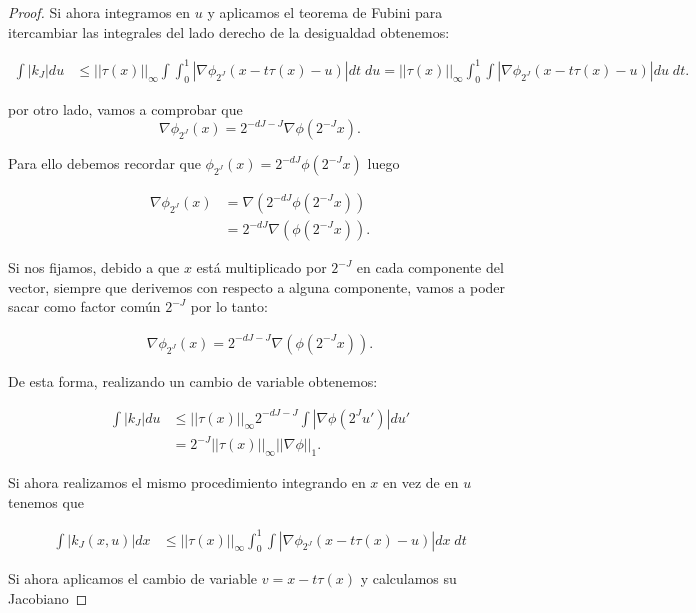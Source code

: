\begin{proof}
  \noindent Si ahora integramos en $u$ y aplicamos el teorema de Fubini para itercambiar las integrales del lado derecho de la desigualdad obtenemos:

  \begin{align*}
    \int |k_J| du &\leq ||\tau(x)||_\infty \int \int_0^1 \left| \nabla \phi_{2^J} (x-t\tau(x)-u)\right|dt \; du = ||\tau(x)||_\infty \int_0^1 \int  \left| \nabla \phi_{2^J} (x-t\tau(x)-u)\right| du \; dt. 
  \end{align*}

  \noindent por otro lado, vamos a comprobar que 
  $$\nabla\phi_{2^J}(x)=2^{-dJ-J} \nabla \phi(2^{-J}x).$$

  \noindent Para ello debemos recordar que $\phi_{2^J}(x)=2^{-dJ}\phi(2^{-J}x)$ luego

  \begin{align*}
    \nabla \phi_{2^J}(x) &= \nabla(2^{-dJ}\phi(2^{-J}x)) \\
    &= 2^{-dJ} \nabla(\phi(2^{-J}x)).
  \end{align*}

  \noindent Si nos fijamos, debido a que $x$ está multiplicado por $2^{-J}$ en cada componente del vector, siempre que derivemos con respecto a alguna componente, vamos a poder sacar como factor común $2^{-J}$ por lo tanto:

  \begin{align*}
    \nabla \phi_{2^J}(x) = 2^{-dJ-J} \nabla(\phi(2^{-J}x)).
  \end{align*}

  \noindent De esta forma, realizando un cambio de variable obtenemos: 

  \begin{align*}
    \int |k_J| du &\leq ||\tau(x)||_\infty  2^{-dJ-J} \int \left| \nabla \phi (2^J u')\right|du' \\
    & = 2^{-J} ||\tau(x)||_\infty ||\nabla\phi||_1. 
  \end{align*}

  \noindent Si ahora realizamos el mismo procedimiento integrando en $x$ en vez de en $u$ tenemos que 

  \begin{align*}
    \int |k_J(x,u)| dx &\leq ||\tau(x)||_\infty \int_0^1 \int \left| \nabla \phi_{2^J} (x-t\tau(x)-u)\right| dx \; dt
  \end{align*}

  \noindent Si ahora aplicamos el cambio de variable $v=x - t\tau(x)$ y calculamos su Jacobiano


\end{proof}
